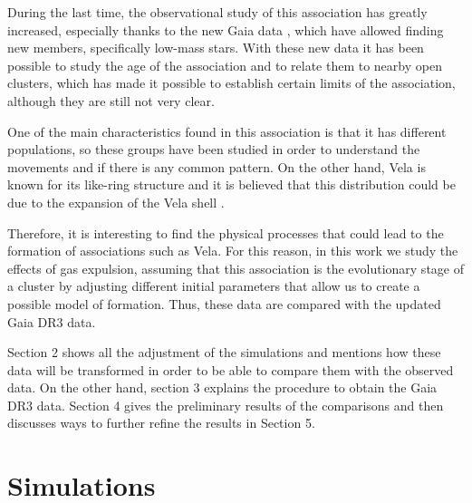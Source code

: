 \documentclass[baaa]{baaa}
\begin{document}
During the last time, the observational study of this association has greatly increased, especially thanks to the new Gaia data \citep{gaia}, which have allowed finding new members, specifically low-mass stars. 
With these new data it has been possible to study the age of the association and to relate them to nearby open clusters, which has made it possible to establish certain limits of the association, although they are still not very clear. 

One of the main characteristics found in this association is that it has different populations, so these groups have been studied in order to understand the movements and if there is any common pattern.
On the other hand, Vela is known for its like-ring structure \citep{sahuS}
and it is believed that this distribution could be due to the expansion of the Vela shell \citep{cantat}. 

Therefore, it is interesting to find the physical processes that could lead to the formation of associations such as Vela. For this reason, in this work we study the effects of gas expulsion, assuming that this association is the evolutionary stage of a cluster by adjusting different initial parameters that allow us to create a possible model of formation. Thus, these data are compared with the updated Gaia DR3 data.


Section 2 shows all the adjustment of the simulations and mentions how these data will be transformed in order to be able to compare them with the observed data. On the other hand, section 3 explains the procedure to obtain the Gaia DR3 data. Section 4 gives the preliminary results of the comparisons and then discusses ways to further refine the results in Section 5.


\section{Simulations}
\end{document}
